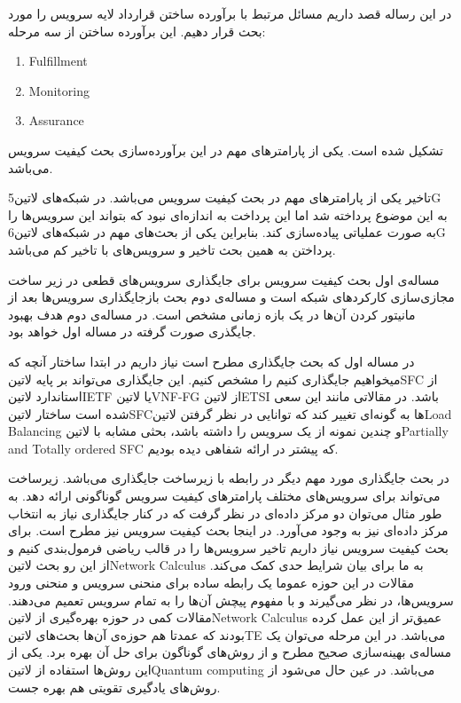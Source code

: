 \documentclass{article}
\begin{document}

در این رساله قصد داریم مسائل مرتبط با برآورده ساختن قرارداد لایه سرویس را مورد بحث قرار دهیم. این برآورده ساختن از سه مرحله:

\begin{latin}\begin{enumerate}
   \item Fulfillment
   \item Monitoring
   \item Assurance
\end{enumerate}\end{latin}

تشکیل شده است. یکی از پارامترهای مهم در این برآورده‌سازی بحث کیفیت سرویس می‌باشد.

تاخیر یکی از پارامترهای مهم در بحث کیفیت سرویس می‌باشد. در شبکه‌های ‌لاتین{5G} به این موضوع پرداخته شد اما این پرداخت به اندازه‌ای نبود که بتواند این سرویس‌ها را به صورت عملیاتی پیاده‌سازی کند.
بنابراین یکی از بحث‌های مهم در شبکه‌های ‌لاتین{6G} پرداختن به همین بحث تاخیر و سرویس‌های با تاخیر کم می‌باشد.

مساله‌ی اول بحث کیفیت سرویس برای جایگذاری سرویس‌های قطعی در زیر ساخت مجازی‌سازی کارکردهای شبکه است و مساله‌ی دوم بحث بازجایگذاری سرویس‌ها بعد از مانیتور کردن آن‌ها در یک بازه زمانی مشخص است.
در مساله‌ی دوم هدف بهبود جایگذری صورت گرفته در مساله اول خواهد بود.

در مساله اول که بحث جایگذاری مطرح است نیاز داریم در ابتدا ساختار آنچه که میخواهیم جایگذاری کنیم را مشخص کنیم. این جایگذاری می‌تواند بر پایه ‌لاتین{SFC} از استاندارد ‌لاتین{IETF} یا ‌لاتین{VNF-FG} از ‌لاتین{ETSI} باشد.
در مقالاتی مانند این سعی شده است ساختار ‌لاتین{SFC}ها به گونه‌ای تغییر کند که توانایی در نظر گرفتن ‌لاتین{Load Balancing} و چندین نمونه از یک سرویس را داشته باشد، بحثی مشابه با ‌لاتین{Partially and Totally ordered SFC} که پیشتر در ارائه شفاهی دیده بودیم.

در بحث جایگذاری مورد مهم دیگر در رابطه با زیرساخت جایگذاری می‌باشد. زیرساخت می‌تواند برای سرویس‌های مختلف پارامترهای کیفیت سرویس گوناگونی ارائه دهد. به طور مثال می‌توان دو مرکز داده‌ای در نظر گرفت که در کنار جایگذاری نیاز به انتخاب مرکز داده‌ای نیز به وجود می‌آورد.
در اینجا بحث کیفیت سرویس نیز مطرح است. برای بحث کیفیت سرویس نیاز داریم تاخیر سرویس‌ها را در قالب ریاضی فرمول‌بندی کنیم و از این رو بحث ‌لاتین{Network Calculus} به ما برای بیان شرایط حدی کمک می‌کند.
مقالات در این حوزه عموما یک رابطه ساده برای منحنی سرویس و منحنی ورود سرویس‌ها، در نظر می‌گیرند و با مفهوم پیچش آن‌ها را به تمام سرویس تعمیم می‌دهند. مقالات کمی در حوزه بهره‌گیری از ‌لاتین{Network Calculus} عمیق‌تر از این عمل کرده بودند که عمدتا هم حوزه‌ی آن‌ها بحث‌های ‌لاتین{TE} می‌باشد.
در این مرحله می‌توان یک مساله‌ی بهینه‌سازی صحیح مطرح و از روش‌های گوناگون برای حل آن بهره برد. یکی از این روش‌ها استفاده از ‌لاتین{Quantum computing} می‌باشد. در عین حال می‌شود از روش‌های یادگیری تقویتی هم بهره جست.
\end{document}
